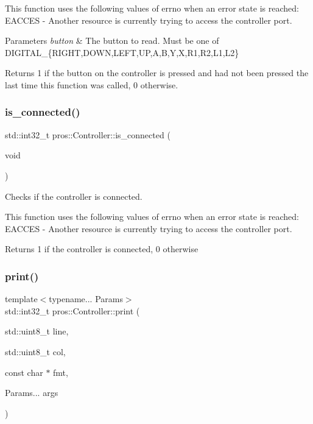 This function uses the following values of errno when an error state is reached\+: E\+A\+C\+C\+ES -\/ Another resource is currently trying to access the controller port.


\begin{DoxyParams}{Parameters}
{\em button} & The button to read. Must be one of D\+I\+G\+I\+T\+A\+L\+\_\+\{R\+I\+G\+HT,D\+O\+WN,L\+E\+FT,UP,A,B,Y,X,R1,R2,L1,L2\}\\
\hline
\end{DoxyParams}
\begin{DoxyReturn}{Returns}
1 if the button on the controller is pressed and had not been pressed the last time this function was called, 0 otherwise. 
\end{DoxyReturn}
\mbox{\label{classpros_1_1Controller_a1a013e9cf1979487f2daabcd729d3ecb}} 
\subsubsection{\texorpdfstring{is\+\_\+connected()}{is\_connected()}}
{\footnotesize\ttfamily std\+::int32\+\_\+t pros\+::\+Controller\+::is\+\_\+connected (\begin{DoxyParamCaption}\item[{void}]{ }\end{DoxyParamCaption})}

Checks if the controller is connected.

This function uses the following values of errno when an error state is reached\+: E\+A\+C\+C\+ES -\/ Another resource is currently trying to access the controller port.

\begin{DoxyReturn}{Returns}
1 if the controller is connected, 0 otherwise 
\end{DoxyReturn}
\mbox{\label{classpros_1_1Controller_a4a301df3d34578661271f9b400da1176}} 
\subsubsection{\texorpdfstring{print()}{print()}}
{\footnotesize\ttfamily template$<$typename... Params$>$ \\
std\+::int32\+\_\+t pros\+::\+Controller\+::print (\begin{DoxyParamCaption}\item[{std\+::uint8\+\_\+t}]{line,  }\item[{std\+::uint8\+\_\+t}]{col,  }\item[{const char $\ast$}]{fmt,  }\item[{Params...}]{args }\end{DoxyParamCaption})\hspace{0.3cm}{\ttfamily [inline]}}

